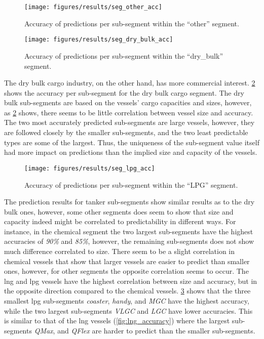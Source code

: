 \begin{figure}[htbp]
    \centering
    \texttt{[image: figures/results/seg\_other\_acc]}
    \caption{Accuracy of predictions per sub-segment within the ``other'' segment.}
    \label{fig:other_accuracy}
\end{figure}
\begin{figure}[htbp]
    \centering
    \texttt{[image: figures/results/seg\_dry\_bulk\_acc]}
    \caption{Accuracy of predictions per sub-segment within the ``dry\_bulk'' segment.}
    \label{fig:dry_bulk_accuracy}
\end{figure}


The dry bulk cargo industry, on the other hand, has more commercial interest. \cref{fig:dry_bulk_accuracy} shows the accuracy per sub-segment for the dry bulk cargo segment. The dry bulk sub-segments are based on the vessels' cargo capacities and sizes, however, as \cref{fig:dry_bulk_accuracy} shows, there seems to be little correlation between vessel size and accuracy. The two most accurately predicted sub-segments are large vessels, however, they are followed closely by the smaller sub-segments, and the two least predictable types are some of the largest. Thus, the uniqueness of the sub-segment value itself had more impact on predictions than the implied size and capacity of the vessels.

\begin{figure}[htbp]
    \centering
    \texttt{[image: figures/results/seg\_lpg\_acc]}
    \caption{Accuracy of predictions per sub-segment within the ``LPG'' segment.}
    \label{fig:lpg_accuracy}
\end{figure}

The prediction results for tanker sub-segments show similar results as to the dry bulk ones, however, some other segments does seem to show that size and capacity indeed might be correlated to predictability in different ways. For instance, in the chemical segment the two largest sub-segments have the highest accuracies of \textit{90\%} and \textit{85\%}, however, the remaining sub-segments does not show much difference correlated to size. There seem to be a slight correlation in chemical vessels that show that larger vessels are easier to predict than smaller ones, however, for other segments the opposite correlation seems to occur. The \acrfull{lng} and \acrfull{lpg} vessels have the highest correlation between size and accuracy, but in the opposite direction compared to the chemical vessels. \cref{fig:lpg_accuracy} shows that the three smallest \acrshort{lpg} sub-segments \textit{coaster}, \textit{handy}, and \textit{MGC} have the highest accuracy, while the two largest sub-segments \textit{VLGC} and \textit{LGC}  have lower accuracies. This is similar to that of the \acrshort{lng} vessels (\cref{fig:lng_accuracy}) where the largest sub-segments \textit{QMax}, and \textit{QFlex} are harder to predict than the smaller sub-segments.

